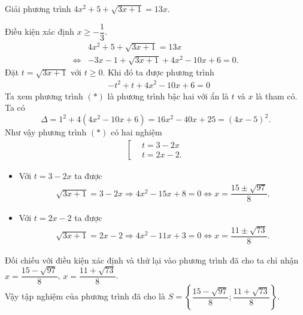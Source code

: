 \begin{bt}%
	Giải phương trình $4x^2 + 5 + \sqrt{3x + 1} = 13x$.
	\loigiai
	{
		Điều kiện xác định $x \geq -\dfrac{1}{3}$.
		\begin{align*}
		& 4x^2 + 5 + \sqrt{3x + 1} = 13x \\
		\Leftrightarrow & -3x-1 + \sqrt{3x+1} + 4x^2-10x+6 = 0.
		\end{align*}
		Đặt $t=\sqrt{3x+1}$ với $t \geq 0$. Khi đó ta được phương trình
		\begin{align*}
		& -t^2 + t + 4x^2-10x+6 = 0 \tag{*}
		\end{align*}
		Ta xem phương trình $(*)$ là phương trình bậc hai với ẩn là $t$ và $x$ là tham có. Ta có
		$$\Delta = 1^2 + 4(4x^2-10x+6) = 16x^2-40x+25 = (4x-5)^2.$$
		Như vậy phương trình $(*)$ có hai nghiệm
		\begin{align*}
		\left[\begin{aligned} & t = 3 - 2x \\& t = 2x - 2.  \end{aligned}\right.
		\end{align*}
		\begin{itemize}
			\item Với $t = 3-2x$ ta được
			\begin{align*}
			\sqrt{3x + 1} = 3-2x \Rightarrow 4x^2 - 15x + 8 = 0 \Leftrightarrow x = \dfrac{15 \pm \sqrt{97}}{8}.
			\end{align*}
			\item Với $t = 2x-2$ ta được
			\begin{align*}
			\sqrt{3x + 1} = 2x-2 \Rightarrow 4x^2 - 11x + 3 = 0 \Leftrightarrow x = \dfrac{11 \pm \sqrt{73}}{8}.
			\end{align*}
		\end{itemize}
		Đối chiếu với điều kiện xác định và thử lại vào phương trình đã cho ta chỉ nhận $x = \dfrac{15-\sqrt{97}}{8}$, $x = \dfrac{11+\sqrt{73}}{8}$.\\
		Vậy tập nghiệm của phương trình đã cho là $S=\left\{\dfrac{15-\sqrt{97}}{8}; \dfrac{11+\sqrt{73}}{8}\right\}$.
	}
\end{bt}


